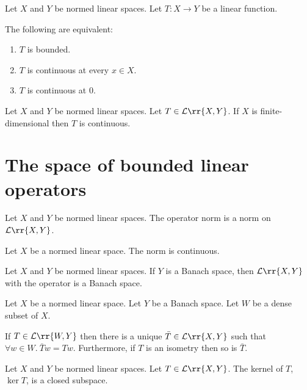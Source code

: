 \documentclass{article}
\begin{document}
\begin{theorem}
  Let $X$ and $Y$ be normed linear spaces. Let $T:X\to Y$ be a linear function.

  The following are equivalent:
  \begin{enumerate}
    \item $T$ is bounded.
    \item $T$ is continuous at every $x\in X$.
    \item $T$ is continuous at $0$.
  \end{enumerate}
\end{theorem}

\begin{theorem}
  Let $X$ and $Y$ be normed linear spaces. Let $T\in\mathcal L\rr{X,Y}$.
  If $X$ is finite-dimensional then $T$ is continuous.
\end{theorem}

\section{The space of bounded linear operators}

\begin{theorem}
  Let $X$ and $Y$ be normed linear spaces. The operator norm is a norm on
  $\mathcal L\rr{X,Y}$.
\end{theorem}

\begin{lemma}
  Let $X$ be a normed linear space. The norm is continuous.
\end{lemma}

\begin{theorem}
  Let $X$ and $Y$ be normed linear spaces. If $Y$ is a Banach space, then
  $\mathcal L\rr{X,Y}$ with the operator is a Banach space.
\end{theorem}

\begin{theorem}
  Let $X$ be a normed linear space. Let $Y$ be a Banach space. Let $W$ be a dense
  subset of $X$.

  If $T\in\mathcal L\rr{W,Y}$ then there is a unique $\bar T\in\mathcal L\rr{X,Y}$
  such that $\forall w\in W.\: \bar T w = T w$. Furthermore, if $T$ is an isometry then so
  is $\bar T$.
\end{theorem}

\begin{theorem}
  Let $X$ and $Y$ be normed linear spaces. Let $T\in\mathcal L\rr{X,Y}$. The kernel of
  $T$, $\ker T$, is a closed subspace.
\end{theorem}
\end{document}
